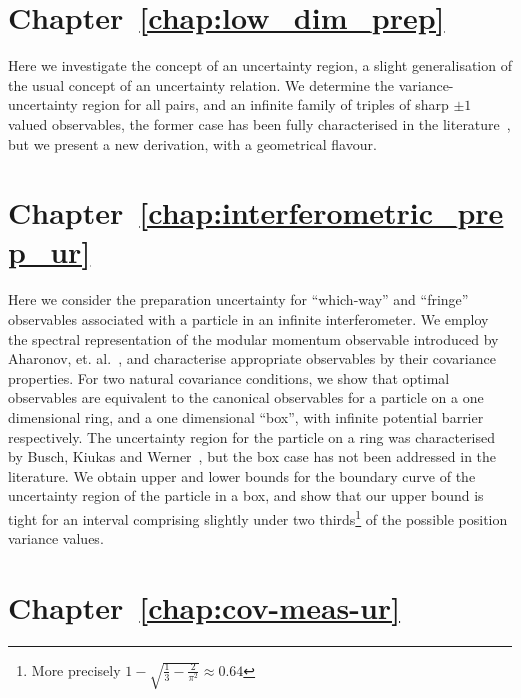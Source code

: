 \section*{Chapter~\ref{chap:low_dim_prep}}

Here we investigate the concept of an uncertainty region, a slight generalisation of the usual concept of an uncertainty relation. We determine the variance-uncertainty region for all pairs, and an infinite family of triples of sharp $\pm 1$ valued observables, the former case has been fully characterised in the literature~\cites{LiQiao2015}{AbbottAlzieuHallBranciard2016}, but we present a new derivation, with a geometrical flavour.

\section*{Chapter~\ref{chap:interferometric_prep_ur}}

Here we consider the preparation uncertainty for ``which-way'' and ``fringe'' observables associated with a particle in an infinite interferometer. We employ the spectral representation of the modular momentum observable introduced by Aharonov, et. al.~\cite{aharonov-modular-variables}, and characterise appropriate observables by their covariance properties. For two natural covariance conditions, we show that optimal observables are equivalent to the canonical observables for a particle on a one dimensional ring, and a one dimensional ``box'', with infinite potential barrier respectively. The uncertainty region for the particle on a ring was characterised by Busch, Kiukas and Werner~\cite{sharp-ur-num-angle}, but the box case has not been addressed in the literature. We obtain upper and lower bounds for the boundary curve of the uncertainty region of the particle in a box, and show that our upper bound is tight for an interval comprising slightly under two thirds\footnote{More precisely $1 - \sqrt{\frac{1}{3} - \frac{2}{\pi^2}} \approx 0.64$} of the possible position variance values.

\section*{Chapter~\ref{chap:cov-meas-ur}}

